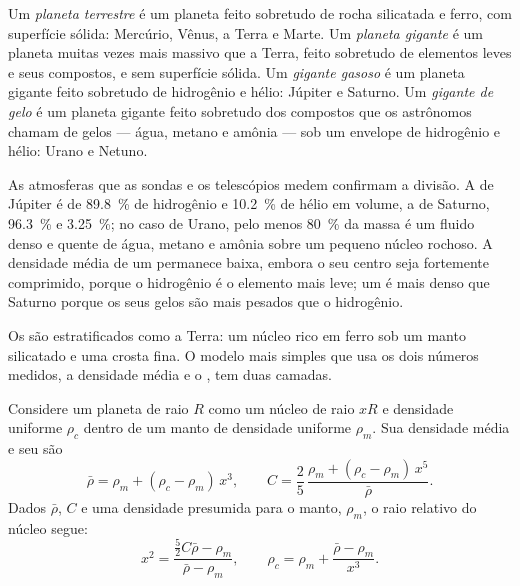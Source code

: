 \begin{definition}\label{def:b1:comparative-planetology:planet-types}
Um \emph{planeta terrestre} é um planeta feito sobretudo de rocha silicatada e ferro, com superfície sólida: Mercúrio, Vênus, a Terra e Marte. Um \emph{planeta gigante} é um planeta muitas vezes mais massivo que a Terra, feito sobretudo de elementos leves e seus compostos, e sem superfície sólida. Um \emph{gigante gasoso} é um planeta gigante feito sobretudo de hidrogênio e hélio: Júpiter e Saturno. Um \emph{gigante de gelo} é um planeta gigante feito sobretudo dos compostos que os astrônomos chamam de gelos --- água, metano e amônia --- sob um envelope de hidrogênio e hélio: Urano e Netuno.
\end{definition}

As atmosferas que as sondas e os telescópios medem confirmam a divisão. A de Júpiter é de \qty{89.8}{\percent} de hidrogênio e \qty{10.2}{\percent} de hélio em volume, a de Saturno, \qty{96.3}{\percent} e \qty{3.25}{\percent}; no caso de Urano, pelo menos \qty{80}{\percent} da massa é um fluido denso e quente de água, metano e amônia sobre um pequeno núcleo rochoso. A densidade média de um  permanece baixa, embora o seu centro seja fortemente comprimido, porque o hidrogênio é o elemento mais leve; um  é mais denso que Saturno porque os seus gelos são mais pesados que o hidrogênio.

Os  são estratificados como a Terra: um núcleo rico em ferro sob um manto silicatado e uma crosta fina. O modelo mais simples que usa os dois números medidos, a densidade média e o , tem duas camadas.

\begin{proposition}\label{prop:b1:comparative-planetology:two-layer}
Considere um planeta de raio $R$ como um núcleo de raio $xR$ e densidade uniforme $\rho_c$ dentro de um manto de densidade uniforme $\rho_m$. Sua densidade média e seu  são
\[
  \bar\rho = \rho_m + (\rho_c - \rho_m)\,x^3 , \qquad
  C = \frac25\,\frac{\rho_m + (\rho_c - \rho_m)\,x^5}{\bar\rho} .
\]
Dados $\bar\rho$, $C$ e uma densidade presumida para o manto, $\rho_m$, o raio relativo do núcleo segue:
\[
  x^2 = \frac{\tfrac52C\bar\rho - \rho_m}{\bar\rho - \rho_m} ,
  \qquad \rho_c = \rho_m + \frac{\bar\rho - \rho_m}{x^3} .
\]
\end{proposition}

